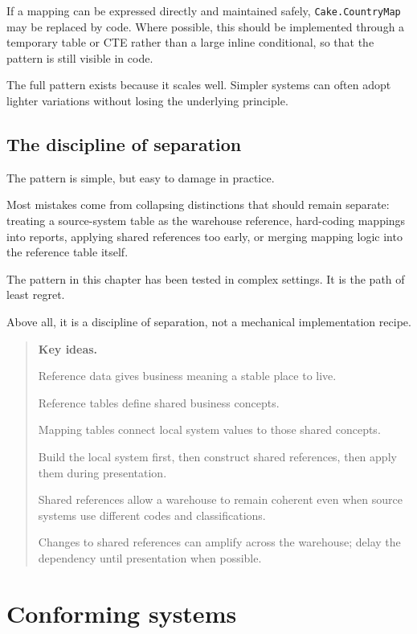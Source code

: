 \documentclass[10pt,openany,10pt]{book}
\begin{document}
If a mapping can be expressed directly and maintained safely,
\texttt{Cake.CountryMap} may be replaced by code. Where possible, this
should be implemented through a temporary table or CTE rather than a
large inline conditional, so that the pattern is still visible in code.

The full pattern exists because it scales well. Simpler systems can
often adopt lighter variations without losing the underlying principle.

\section{The discipline of
separation}\label{the-discipline-of-separation}

The pattern is simple, but easy to damage in practice.

Most mistakes come from collapsing distinctions that should remain
separate: treating a source-system table as the warehouse reference,
hard-coding mappings into reports, applying shared references too early,
or merging mapping logic into the reference table itself.

The pattern in this chapter has been tested in complex settings. It is
the path of least regret.

Above all, it is a discipline of separation, not a mechanical
implementation recipe.

\begin{quote}
\textbf{Key ideas.}

Reference data gives business meaning a stable place to live.

Reference tables define shared business concepts.

Mapping tables connect local system values to those shared concepts.

Build the local system first, then construct shared references, then
apply them during presentation.

Shared references allow a warehouse to remain coherent even when source
systems use different codes and classifications.

Changes to shared references can amplify across the warehouse; delay the
dependency until presentation when possible.
\end{quote}

\newpage

\chapter{Conforming
systems}\label{docs-creating-information-conforming-systems}
\end{document}
